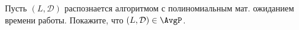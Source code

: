 Пусть $(L, \mathcal{D})$ распознается алгоритмом с полиномиальным мат. ожиданием времени
работы. Покажите, что $(L, \mathcal{D}) \in \AvgP$. 